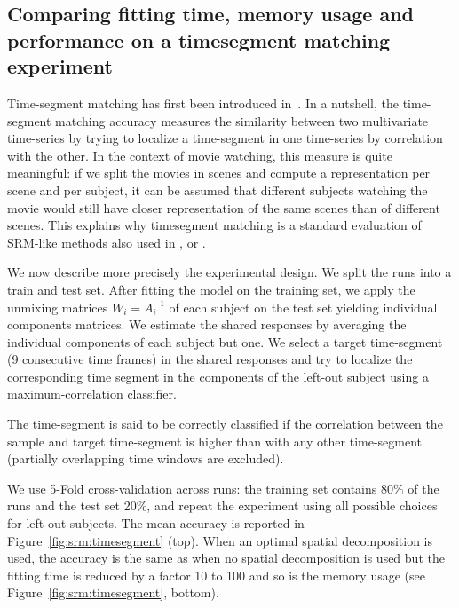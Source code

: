 \documentclass{article}
\begin{document}
\subsection{Comparing fitting time, memory usage and performance on a
  timesegment matching experiment}
\label{sec:timesegment_expe}
\label{timesegment_expe}
Time-segment matching has first been introduced
in~\cite{chen2015reduced}.
%
In a nutshell, the time-segment matching accuracy measures the similarity
between two multivariate time-series by trying to localize a time-segment in one
time-series by correlation with the other.
%
In the context of movie watching, this measure is quite meaningful: if
we split the movies in scenes and compute a representation per scene
and per subject, it can be assumed that different subjects watching
the movie would still have closer representation of the same scenes
than of different scenes.
%
This explains why timesegment matching is a standard evaluation of SRM-like methods also used in  \cite{guntupalli2018computational}, \cite{Nastase741975} or
\cite{zhang2016searchlight}.
%


We now describe more precisely the experimental design.
%
We split the runs into a train and test set.
%
After fitting the model on the
training set, we apply the unmixing matrices $W_i=A_i^{-1}$ of each subject on
the test set yielding individual components matrices.
%
We estimate the shared responses by averaging the individual components of each
subject but one.
%
We select a target time-segment (9 consecutive time frames) in the shared
responses and try to localize the corresponding time segment in the components
of the left-out subject using a maximum-correlation classifier.
%

The time-segment is said to be
correctly classified if the correlation between the sample and target
time-segment is higher than with any other time-segment (partially overlapping
time windows are excluded).
%

% 
We use 5-Fold cross-validation across runs: the training set contains 80\% of
the runs and the test set 20\%, and repeat the experiment using all possible
choices for left-out subjects.
%
% 
The mean accuracy is reported in Figure~\ref{fig:srm:timesegment} (top).
%
When an optimal spatial decomposition is used, the accuracy is the same as when no
spatial decomposition is used but the fitting time is reduced by a factor 10 to 100
and so is the memory usage (see Figure~\ref{fig:srm:timesegment},
bottom).
%

% 
\end{document}
